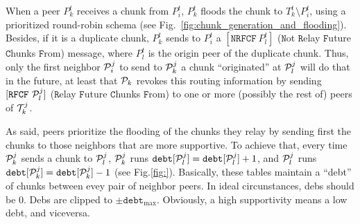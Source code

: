 \label{sec:chunk_flooding}
When a peer $P^t_k$ receives a chunk from $P^t_i$, $P^t_k$ floods the
chunk to $T^t_k \setminus P^t_i$, using a prioritized round-robin
schema (see Fig.~\ref{fig:chunk_generation_and_flooding}). Besides, if
it is a duplicate chunk, $P^t_k$ sends to $P^t_i$ a
$[\mathtt{NRFCF}~P^t_l]$ ($\mathtt{N}$ot $\mathtt{R}$elay
$\mathtt{F}$uture $\mathtt{C}$hunks $\mathtt{F}$rom) message, where
$P^t_l$ is the origin peer of the duplicate chunk. Thus, only
the first neighbor ${\cal P}^j_i$ to send to ${\cal P}^j_k$ a chunk
``originated'' at ${\cal P}^j_l$ will do that in the future, at least
that ${\cal P}_k$ revokes this routing information by sending
$[\mathtt{RFCF}~{\cal P}^j_l]$ ($\mathtt{R}$elay $\mathtt{F}$uture
$\mathtt{C}$hunks $\mathtt{F}$rom) to one or more (possibly the rest
of) peers of ${\cal T}^j_k$.

As said, peers prioritize the flooding of the chunks they relay by
sending first the chunks to those neighbors that are more
supportive. To achieve that, every time ${\cal P}^j_k$ sends a chunk
to ${\cal P}^j_l$, ${\cal P}^j_k$ runs $\mathtt{debt}[{\cal P}^j_l]
= \mathtt{debt}[{\cal P}^j_l]+1$, and ${\cal P}^j_l$ runs
$\mathtt{debt}[{\cal P}^j_k] =
\mathtt{debt}[{\cal P}^j_k]-1$ (see Fig.\ref{fig:}). Basically, these
tables maintain a ``debt'' of chunks between evey pair of neighbor
peers. In ideal circunstances, debs should be $0$. Debs are clipped to
$\pm\mathtt{debt}_{\text{max}}$. Obviously, a high supportivity means
a low debt, and viceversa.

\begin{comment}
In each round, peers check if a chunk have been received from the rest
of peers of the team (${\cal P}_k\in {\cal T}_j)$). If not, peers send
a $[\mathtt{propagate}~{\cal P}_i]$ to one or more (possibly
to the rest of) peers of the team, where ${\cal P}_i$ is the origin peer
of the missing chunk. At this point, the process continues as
described in Section~\ref{dbs:chunk_flooding}.
\end{comment}

\begin{comment}
For each ${\cal P}_k\in N({\cal P}_i)$, ${\cal P}_i$ checks if a chunk
has been received from ${\cal P}_k$. If ${\cal P}_i$ detects that
${\cal P}_k$ has not sent a chunk to it during $L$ consecutive rounds,
performs $N({\cal P}_i) = N({\cal P}_i)\setminus{\cal P}_k$, and stops
sending to ${\cal P}_k$ more chunks.
\end{comment}
\begin{comment}
computes a
``chunk-debt'', denoted by $d({\cal P}_k)$, that is incremented each
time a chunk is received from ${\cal P}_k$ and decremented each time a
chunk is sent to ${\cal P}_k$. If ${\cal P}_i$ verifies that $d({\cal
  P}_k)>D$ (the maximum debt), then ${\cal P}_i$ considers that ${\cal
  P}_k$ is unable to communicate with it, performs $N({\cal P}_i) =
N({\cal P}_i)\setminus{\cal P}_k$, and stops sending to ${\cal P}_k$
more chunks.
\end{comment}


